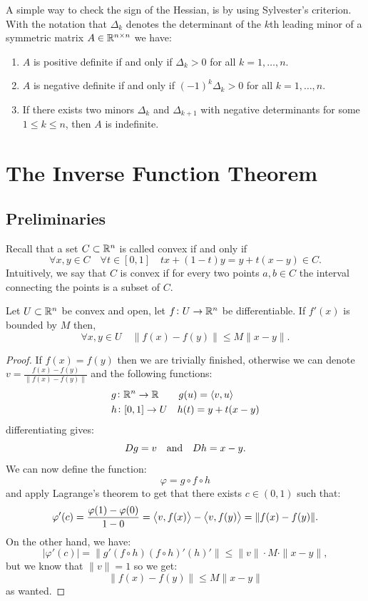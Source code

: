 \documentclass[11pt,a4paper]{article}
\begin{document}
\begin{remark}
  A simple way to check the sign of the Hessian,
  is by using Sylvester's criterion.
  With the notation that $\Delta_k$ denotes the determinant of the $k$th leading
  minor of a symmetric matrix $A \in \mathbb{R}^{n \times n}$ we have:
  \begin{enumerate}
    \item[(1)] $A$ is positive definite if and only if $\Delta_k > 0$
      for all $k = 1,\dots,n$.
    \item[(2)] $A$ is negative definite if and only if
      $(-1)^k \Delta_k > 0$ for all $k=1,\dots,n$.
    \item[(3)] If there exists two minors $\Delta_{k}$ and $\Delta_{k+1}$
      with negative determinants for some $1 \le k \le n$,
      then $A$ is indefinite.
  \end{enumerate}
\end{remark}

\newpage

\section{The Inverse Function Theorem}
\subsection{Preliminaries}
Recall that a set $C \subset \mathbb{R}^n$ is called convex if and only if
\[
  \forall x,y \in C \quad \forall t \in [0,1] \quad
  tx + (1-t)y = y + t(x-y) \in C.
\]
Intuitively, we say that $C$ is convex if for every two points $a,b \in C$
the interval connecting the points is a subset of $C$.

\begin{proposition}
  \label{prp:bounded-derivative-implies-lipschitz}
  Let $U \subset \mathbb{R}^n$ be convex and open, let $f \colon U \to \mathbb{R}^n$
  be differentiable. If $f'(x)$ is bounded by $M$ then,
  \[
     \forall x,y \in U \quad \|f(x) - f(y)\| \le M\|x - y\|.
  \]
\end{proposition}
\begin{proof}
  If $f(x) = f(y)$ then we are trivially finished, otherwise we can
  denote $v = \frac{f(x) - f(y)}{\|f(x) - f(y)\|}$ and the following
  functions:
  \begin{align*}
    &g \colon \mathbb{R}^n \to \mathbb{R} \quad \quad g(u) = \left\langle v, u \right\rangle \\
    &h \colon [0,1] \to U \quad h(t) = y + t(x-y)
  \end{align*}
  differentiating gives:
  \[
    Dg = v \quad \text{and} \quad Dh = x-y.
  \]
  We can now define the function:
  \[
    \varphi = g \circ f \circ h
  \]
  and apply Lagrange's theorem to get that there exists $c \in (0,1)$ such that:
  \[
    \varphi'(c) = \frac{\varphi(1) - \varphi(0)}{1 - 0} = 
    \left\langle v, f(x) \right\rangle - \left\langle v, f(y) \right\rangle = \|f(x) - f(y)\|.
  \]
  On the other hand, we have:
  \[
    |\varphi'(c)| = \|g'(f \circ h)(f \circ h)'(h)'\| \le 
    \|v\| \cdot M \cdot \|x - y\|,
  \]
  but we know that $\|v\| = 1$ so we get:
  \[
    \|f(x) - f(y)\| \le M\|x - y\|
  \]
  as wanted.
\end{proof}
\end{document}
